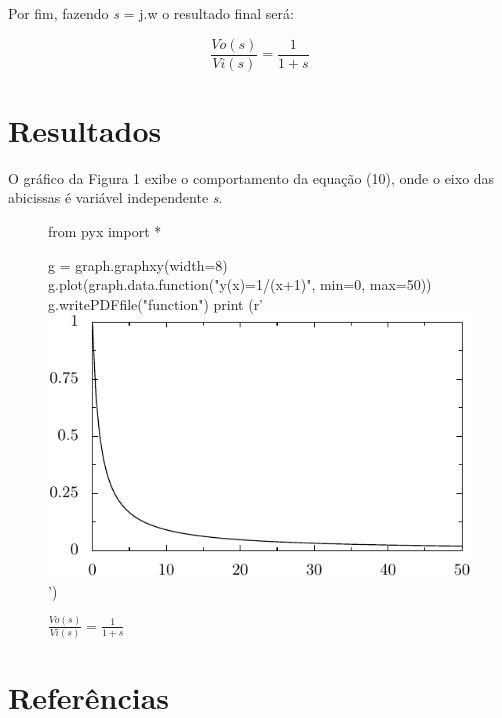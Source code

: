 \documentclass[12pt]{article}
\begin{document}
Por fim, fazendo \textit{s} = j.w o resultado final será:

\begin{equation}
\frac{Vo(s)}{Vi(s)}=\frac{1}{1+\textit{s}}
\end{equation}

\section{Resultados}
O gráfico da Figura 1 exibe o comportamento da equação (10), onde o eixo das abicissas é variável independente  \textit{s}. 

\begin{figure}[h]
\centering
\begin{pycode}

from pyx import *

g = graph.graphxy(width=8)
g.plot(graph.data.function("y(x)=1/(x+1)", min=0, max=50))
g.writePDFfile("function")
print (r'\includegraphics{function}')
\end{pycode}
\caption{$\frac{Vo(s)}{Vi(s)}=$$\frac{1}{1+s}$}
\end{figure}

\section{Referências}




\end{document}
